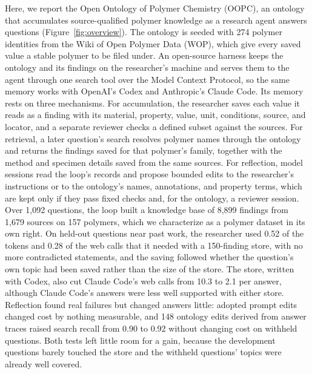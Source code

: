 \documentclass[journal=mamobx,manuscript=article]{achemso}
\begin{document}
Here, we report the Open Ontology of Polymer Chemistry (OOPC), an ontology that accumulates source-qualified polymer knowledge as a research agent answers questions (Figure~\ref{fig:overview}).
The ontology is seeded with 274 polymer identities from the Wiki of Open Polymer Data (WOP),\cite{WOP2026Wiki} which give every saved value a stable polymer to be filed under.
An open-source harness keeps the ontology and its findings on the researcher's machine and serves them to the agent through one search tool over the Model Context Protocol, so the same memory works with OpenAI's Codex and Anthropic's Claude Code.
Its memory rests on three mechanisms.
For accumulation, the researcher saves each value it reads as a finding with its material, property, value, unit, conditions, source, and locator, and a separate reviewer checks a defined subset against the sources.
For retrieval, a later question's search resolves polymer names through the ontology and returns the findings saved for that polymer's family, together with the method and specimen details saved from the same sources.
For reflection, model sessions read the loop's records and propose bounded edits to the researcher's instructions or to the ontology's names, annotations, and property terms, which are kept only if they pass fixed checks and, for the ontology, a reviewer session.
Over 1,092 questions, the loop built a knowledge base of 8,899 findings from 1,679 sources on 157 polymers, which we characterize as a polymer dataset in its own right.
On held-out questions near past work, the researcher used 0.52 of the tokens and 0.28 of the web calls that it needed with a 150-finding store, with no more contradicted statements, and the saving followed whether the question's own topic had been saved rather than the size of the store.
The store, written with Codex, also cut Claude Code's web calls from 10.3 to 2.1 per answer, although Claude Code's answers were less well supported with either store.
Reflection found real failures but changed answers little: adopted prompt edits changed cost by nothing measurable, and 148 ontology edits derived from answer traces raised search recall from 0.90 to 0.92 without changing cost on withheld questions.
Both tests left little room for a gain, because the development questions barely touched the store and the withheld questions' topics were already well covered.
\end{document}
